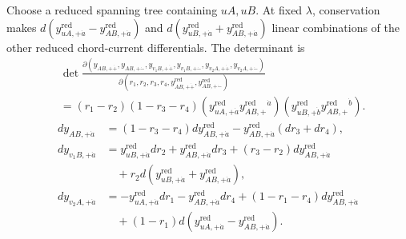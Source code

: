 \documentclass[11pt]{article}
\numberwithin{equation}{section}
\numberwithin{figure}{section}
\numberwithin{table}{section}
\begin{document}
\begin{proofbox}
Choose a reduced spanning tree containing $uA,uB$. At fixed $\lambda$, conservation makes $d(y_{uA,+\dot a}^{\mathrm{red}}-y_{AB,+\dot a}^{\mathrm{red}})$ and $d(y_{uB,+\dot a}^{\mathrm{red}}+y_{AB,+\dot a}^{\mathrm{red}})$ linear combinations of the other reduced chord-current differentials. The determinant is
\begin{equation*}
\begin{aligned}
&\det\frac{\partial(y_{AB,+\dot+},y_{AB,+\dot-},y_{v_1B,+\dot+},y_{v_1B,+\dot-},y_{v_2A,+\dot+},y_{v_2A,+\dot-})}
{\partial(r_1,r_2,r_3,r_4,y_{AB,+\dot+}^{\mathrm{red}},y_{AB,+\dot-}^{\mathrm{red}})}\\
&=(r_1-r_2)(1-r_3-r_4)
(y_{uA,+\dot a}^{\mathrm{red}}y_{AB,+}^{\mathrm{red}}{}^{\dot a})
(y_{uB,+\dot b}^{\mathrm{red}}y_{AB,+}^{\mathrm{red}}{}^{\dot b}).
\end{aligned}
\end{equation*}
\begin{equation*}
\begin{aligned}
dy_{AB,+\dot a}
&=(1-r_3-r_4)dy_{AB,+\dot a}^{\mathrm{red}}
-y_{AB,+\dot a}^{\mathrm{red}}(dr_3+dr_4),\\
dy_{v_1B,+\dot a}
&=y_{uB,+\dot a}^{\mathrm{red}}dr_2+y_{AB,+\dot a}^{\mathrm{red}}dr_3
+(r_3-r_2)dy_{AB,+\dot a}^{\mathrm{red}}\\
&\quad+r_2d\!\left(y_{uB,+\dot a}^{\mathrm{red}}+y_{AB,+\dot a}^{\mathrm{red}}\right),\\
dy_{v_2A,+\dot a}
&=-y_{uA,+\dot a}^{\mathrm{red}}dr_1-y_{AB,+\dot a}^{\mathrm{red}}dr_4
+(1-r_1-r_4)dy_{AB,+\dot a}^{\mathrm{red}}\\
&\quad+(1-r_1)d\!\left(y_{uA,+\dot a}^{\mathrm{red}}-y_{AB,+\dot a}^{\mathrm{red}}\right).
\end{aligned}
\end{equation*}


\end{proofbox}
\end{document}
